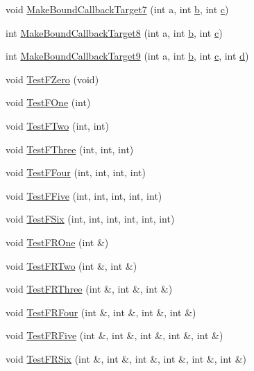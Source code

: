 \begin{DoxyCompactItemize}
void \hyperlink{callback-test-suite_8cc_a5baa7e1ee1f068893c97a20f2bbc2d97}{Make\+Bound\+Callback\+Target7} (int a, int \hyperlink{lte__pathloss_8m_a21ad0bd836b90d08f4cf640b4c298e7c}{b}, int \hyperlink{mmwave_2model_2fading-traces_2fading__trace__generator_8m_ae0323a9039add2978bf5b49550572c7c}{c})
\item 
int \hyperlink{callback-test-suite_8cc_a3b2c793123d3f609d4e1eeee965dac5c}{Make\+Bound\+Callback\+Target8} (int a, int \hyperlink{lte__pathloss_8m_a21ad0bd836b90d08f4cf640b4c298e7c}{b}, int \hyperlink{mmwave_2model_2fading-traces_2fading__trace__generator_8m_ae0323a9039add2978bf5b49550572c7c}{c})
\item 
int \hyperlink{callback-test-suite_8cc_aac4d508c598787e6bd71ba6323d3b8f3}{Make\+Bound\+Callback\+Target9} (int a, int \hyperlink{lte__pathloss_8m_a21ad0bd836b90d08f4cf640b4c298e7c}{b}, int \hyperlink{mmwave_2model_2fading-traces_2fading__trace__generator_8m_ae0323a9039add2978bf5b49550572c7c}{c}, int \hyperlink{lte__pathloss_8m_a1aabac6d068eef6a7bad3fdf50a05cc8}{d})
\item 
void \hyperlink{callback-test-suite_8cc_a032c27d1e01150afbaebce4af4cff016}{Test\+F\+Zero} (void)
\item 
void \hyperlink{callback-test-suite_8cc_aa9207bf060f53906a157021e6d91fcee}{Test\+F\+One} (int)
\item 
void \hyperlink{callback-test-suite_8cc_ac5d2606448b1e79bc8b8244b5ff54dfa}{Test\+F\+Two} (int, int)
\item 
void \hyperlink{callback-test-suite_8cc_abedc8872680c743b016665a132efad89}{Test\+F\+Three} (int, int, int)
\item 
void \hyperlink{callback-test-suite_8cc_a9eec0c89ecc47a71bbeb60e79d33a2b5}{Test\+F\+Four} (int, int, int, int)
\item 
void \hyperlink{callback-test-suite_8cc_a82de616ca24ca7a9b29ff61a84c35777}{Test\+F\+Five} (int, int, int, int, int)
\item 
void \hyperlink{callback-test-suite_8cc_a2870899394543fe04ff441a5d5d10b91}{Test\+F\+Six} (int, int, int, int, int, int)
\item 
void \hyperlink{callback-test-suite_8cc_a61b9adbb88b46ac9041f1a9fc372a1e9}{Test\+F\+R\+One} (int \&)
\item 
void \hyperlink{callback-test-suite_8cc_a6299ca42c6a4c5f2ceaa54ef9accb768}{Test\+F\+R\+Two} (int \&, int \&)
\item 
void \hyperlink{callback-test-suite_8cc_aa528c88a201570c6872cf3859787e17c}{Test\+F\+R\+Three} (int \&, int \&, int \&)
\item 
void \hyperlink{callback-test-suite_8cc_ae3298a776dfd45ff55232b25c34636e3}{Test\+F\+R\+Four} (int \&, int \&, int \&, int \&)
\item 
void \hyperlink{callback-test-suite_8cc_a99e4f11075598012ae84ea874c69c548}{Test\+F\+R\+Five} (int \&, int \&, int \&, int \&, int \&)
\item 
void \hyperlink{callback-test-suite_8cc_ae156cb962f117de688fca4d4e6b664c0}{Test\+F\+R\+Six} (int \&, int \&, int \&, int \&, int \&, int \&)
\end{DoxyCompactItemize}
